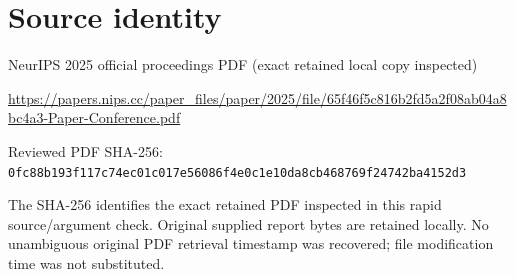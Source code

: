 \documentclass[11pt]{article}
\begin{document}
\section*{Source identity}

NeurIPS 2025 official proceedings PDF (exact retained local copy inspected)

\url{https://papers.nips.cc/paper_files/paper/2025/file/65f46f5c816b2fd5a2f08ab04a8bc4a3-Paper-Conference.pdf}

Reviewed PDF SHA-256: \nolinkurl{0fc88b193f117c74ec01c017e56086f4e0c1e10da8cb468769f24742ba4152d3}

The SHA-256 identifies the exact retained PDF inspected in this rapid source/argument check. Original supplied report bytes are retained locally. No unambiguous original PDF retrieval timestamp was recovered; file modification time was not substituted.
\end{document}
